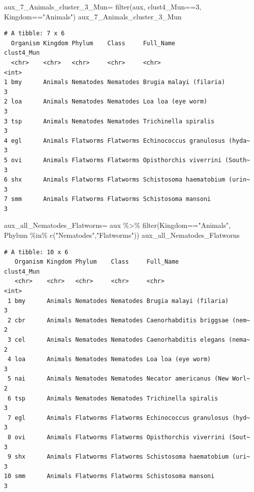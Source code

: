 \documentclass[
  letterpaper,
  DIV=11,
  numbers=noendperiod]{scrreprt}
\newenvironment{Shaded}{}{}
\newcommand{\DecValTok}[1]{\textcolor[rgb]{0.82,0.60,0.40}{#1}}
\newcommand{\FunctionTok}[1]{\textcolor[rgb]{0.38,0.69,0.94}{#1}}
\newcommand{\NormalTok}[1]{\textcolor[rgb]{0.67,0.70,0.75}{#1}}
\newcommand{\OtherTok}[1]{\textcolor[rgb]{0.15,0.68,0.38}{#1}}
\newcommand{\SpecialCharTok}[1]{\textcolor[rgb]{0.34,0.71,0.76}{#1}}
\newcommand{\StringTok}[1]{\textcolor[rgb]{0.60,0.76,0.47}{#1}}
\begin{document}
\begin{Shaded}
\begin{Highlighting}[]
\NormalTok{aux\_7\_Animals\_cluster\_3\_Mun}\OtherTok{=} \FunctionTok{filter}\NormalTok{(aux,}
\NormalTok{                                clust4\_Mun}\SpecialCharTok{==}\DecValTok{3}\NormalTok{,}
\NormalTok{                                Kingdom}\SpecialCharTok{==}\StringTok{"Animals"}\NormalTok{)}
\NormalTok{aux\_7\_Animals\_cluster\_3\_Mun}
\end{Highlighting}
\end{Shaded}

\begin{verbatim}
# A tibble: 7 x 6
  Organism Kingdom Phylum    Class     Full_Name                      clust4_Mun
  <chr>    <chr>   <chr>     <chr>     <chr>                               <int>
1 bmy      Animals Nematodes Nematodes Brugia malayi (filaria)                 3
2 loa      Animals Nematodes Nematodes Loa loa (eye worm)                      3
3 tsp      Animals Nematodes Nematodes Trichinella spiralis                    3
4 egl      Animals Flatworms Flatworms Echinococcus granulosus (hyda~          3
5 ovi      Animals Flatworms Flatworms Opisthorchis viverrini (South~          3
6 shx      Animals Flatworms Flatworms Schistosoma haematobium (urin~          3
7 smm      Animals Flatworms Flatworms Schistosoma mansoni                     3
\end{verbatim}

\begin{Shaded}
\begin{Highlighting}[]
\NormalTok{aux\_all\_Nematodes\_Flatworns}\OtherTok{=}\NormalTok{ aux }\SpecialCharTok{\%\textgreater{}\%} 
  \FunctionTok{filter}\NormalTok{(Kingdom}\SpecialCharTok{==}\StringTok{"Animals"}\NormalTok{,}
\NormalTok{         Phylum }\SpecialCharTok{\%in\%} \FunctionTok{c}\NormalTok{(}\StringTok{"Nematodes"}\NormalTok{,}\StringTok{"Flatworms"}\NormalTok{))}
\NormalTok{aux\_all\_Nematodes\_Flatworns}
\end{Highlighting}
\end{Shaded}

\begin{verbatim}
# A tibble: 10 x 6
   Organism Kingdom Phylum    Class     Full_Name                     clust4_Mun
   <chr>    <chr>   <chr>     <chr>     <chr>                              <int>
 1 bmy      Animals Nematodes Nematodes Brugia malayi (filaria)                3
 2 cbr      Animals Nematodes Nematodes Caenorhabditis briggsae (nem~          2
 3 cel      Animals Nematodes Nematodes Caenorhabditis elegans (nema~          2
 4 loa      Animals Nematodes Nematodes Loa loa (eye worm)                     3
 5 nai      Animals Nematodes Nematodes Necator americanus (New Worl~          2
 6 tsp      Animals Nematodes Nematodes Trichinella spiralis                   3
 7 egl      Animals Flatworms Flatworms Echinococcus granulosus (hyd~          3
 8 ovi      Animals Flatworms Flatworms Opisthorchis viverrini (Sout~          3
 9 shx      Animals Flatworms Flatworms Schistosoma haematobium (uri~          3
10 smm      Animals Flatworms Flatworms Schistosoma mansoni                    3
\end{verbatim}
\end{document}
